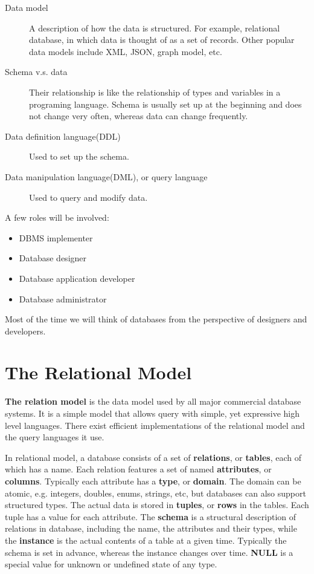 \begin{description}
\item[Data model]A description of how the data is structured. For example, relational database, in which data is thought of as a set of records. Other popular data models include XML, JSON, graph model, etc.
\item[Schema v.s. data]Their relationship is like the relationship of types and variables in a programing language. Schema is usually set up at the beginning and does not change very often, whereas data can change frequently.
\item[Data definition language(DDL)]Used to set up the schema.
\item[Data manipulation language(DML), or query language]Used to query and modify data.
\end{description}
A few roles will be involved:
\begin{itemize}
\item DBMS implementer
\item Database designer
\item Database application developer
\item Database administrator
\end{itemize}
Most of the time we will think of databases from the perspective of designers and developers.
\section{The Relational Model}
\textbf{The relation model} is the data model used by all major commercial database systems. It is a simple model that allows query with simple, yet expressive high level languages. There exist efficient implementations of the relational model and the query languages it use. 

In relational model, a database consists of a set of \textbf{relations}, or \textbf{tables}, each of which has a name. Each relation features a set of named \textbf{attributes}, or \textbf{columns}. Typically each attribute has a \textbf{type}, or \textbf{domain}. The domain can be atomic, e.g. integers, doubles, enums, strings, etc, but databases can also support structured types. The actual data is stored in \textbf{tuples}, or \textbf{rows} in the tables. Each tuple has a value for each attribute. The \textbf{schema} is a structural description of relations in database, including the name, the attributes and their types, while the \textbf{instance} is the actual contents of a table at a given time. Typically the schema is set in advance, whereas the instance changes over time. \textbf{NULL} is a special value for unknown or undefined state of any type.
\ifx\PREAMBLE\undefined

\fi